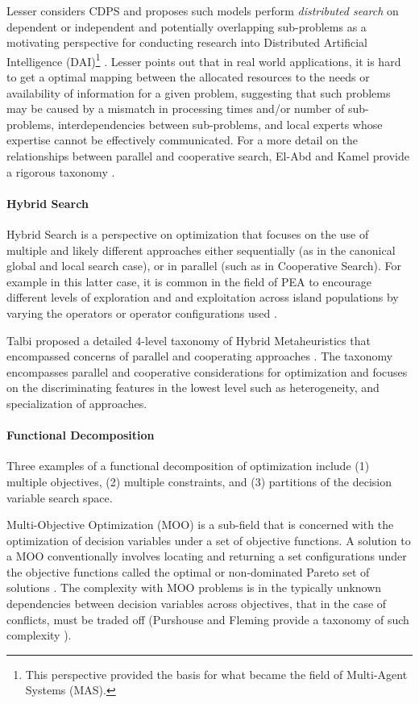 Lesser considers CDPS and proposes such models perform \emph{distributed search} on dependent or independent and potentially overlapping sub-problems as a motivating perspective for conducting research into Distributed Artificial Intelligence (DAI)\footnote{This perspective provided the basis for what became the field of Multi-Agent Systems (MAS).} \cite{Lesser1990}. Lesser points out that in real world applications, it is hard to get a optimal mapping between the allocated resources to the needs or availability of information for a given problem, suggesting that such problems may be caused by a mismatch in processing times and/or number of sub-problems, interdependencies between sub-problems, and local experts whose expertise cannot be effectively communicated. For a more detail on the relationships between parallel and cooperative search, El-Abd and Kamel provide a rigorous taxonomy \cite{El-Abd2005}.
	
\paragraph{Hybrid Search}
Hybrid Search is a perspective on optimization that focuses on the use of multiple and likely different approaches either sequentially (as in the canonical global and local search case), or in parallel (such as in Cooperative Search). For example in this latter case, it is common in the field of PEA to encourage different levels of exploration and and exploitation across island populations by varying the operators or operator configurations used \cite{Tanese1989, Adamidis1996}. 

Talbi proposed a detailed 4-level taxonomy of Hybrid Metaheuristics that encompassed concerns of parallel and cooperating approaches \cite{Talbi2001}. The taxonomy encompasses parallel and cooperative considerations for optimization and focuses on the discriminating features in the lowest level such as heterogeneity, and specialization of approaches.
	
\paragraph{Functional Decomposition}
Three examples of a functional decomposition of optimization include (1) multiple objectives, (2) multiple constraints, and (3) partitions of the decision variable search space. 

Multi-Objective Optimization (MOO) is a sub-field that is concerned with the optimization of decision variables under a set of objective functions. A solution to a MOO conventionally involves locating and returning a set configurations under the objective functions called the optimal or non-dominated Pareto set of solutions \cite{Deb2001}. The complexity with MOO problems is in the typically unknown dependencies between decision variables across objectives, that in the case of conflicts, must be traded off (Purshouse and Fleming provide a taxonomy of such complexity \cite{Purshouse2003}). 

